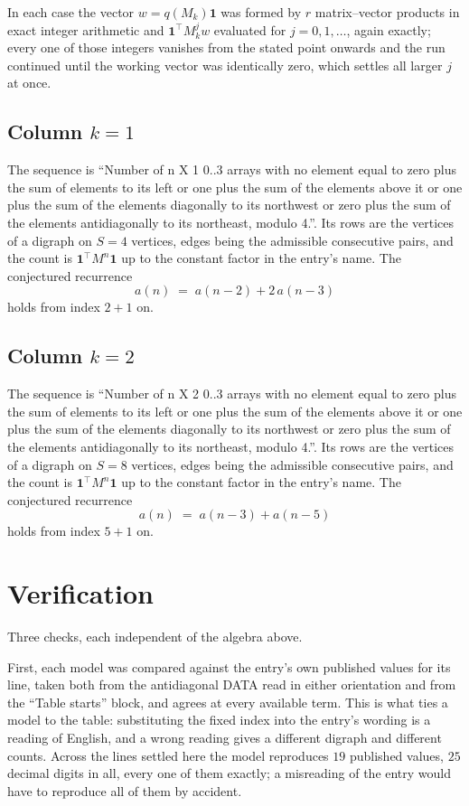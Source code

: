 \documentclass[11pt,a4paper]{article}
\theoremstyle{plain}
\theoremstyle{definition}
\begin{document}
In each case the vector $w=q(M_k)\mathbf{1}$ was formed by $r$ matrix--vector products in
exact integer arithmetic and $\mathbf{1}^{\!\top}M_k^{j}w$ evaluated for $j=0,1,\dots$,
again exactly; every one of those integers vanishes from the stated point onwards and the run
continued until the working vector was identically zero, which settles all larger $j$ at once.

\subsection*{Column $k$$=1$}
The sequence is ``Number of n X 1 0..3 arrays with no element equal to zero plus the sum of elements to its left or one plus the sum of the elements above it or one plus the sum of the elements diagonally to its northwest or zero plus the sum of the elements antidiagonally to its northeast, modulo 4.''. Its rows are the vertices of a digraph on
$S=4$ vertices, edges being the admissible consecutive pairs, and the count is
$\mathbf{1}^{\!\top}M^{n}\mathbf{1}$ up to the constant factor in the entry's name.
The conjectured recurrence
\[
a(n)\;=\;a(n-2) + 2\,a(n-3)
\]
holds from index $2+1$ on.

\subsection*{Column $k$$=2$}
The sequence is ``Number of n X 2 0..3 arrays with no element equal to zero plus the sum of elements to its left or one plus the sum of the elements above it or one plus the sum of the elements diagonally to its northwest or zero plus the sum of the elements antidiagonally to its northeast, modulo 4.''. Its rows are the vertices of a digraph on
$S=8$ vertices, edges being the admissible consecutive pairs, and the count is
$\mathbf{1}^{\!\top}M^{n}\mathbf{1}$ up to the constant factor in the entry's name.
The conjectured recurrence
\[
a(n)\;=\;a(n-3) + a(n-5)
\]
holds from index $5+1$ on.

\section{Verification}

Three checks, each independent of the algebra above.

First, each model was compared against the entry's own published values for its line, taken
both from the antidiagonal DATA read in either orientation and from the ``Table starts''
block, and agrees at every available term. This is what ties a model to the table:
substituting the fixed index into the entry's wording is a reading of English, and a wrong
reading gives a different digraph and different counts. Across the lines settled here the
model reproduces $19$ published values, $25$ decimal digits in all, every one of
them exactly; a misreading of the entry would have to reproduce all of them by accident.
\end{document}
